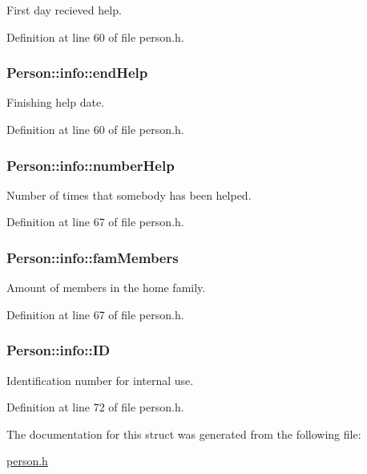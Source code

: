 First day recieved help. 



Definition at line 60 of file person.\+h.

\hypertarget{struct_person_1_1info_acc738154c5e01adc22c880fc49d6e09c}{
\subsubsection[{end\+Help}]{\setlength{\rightskip}{0pt plus 5cm}Person\+::info\+::end\+Help}}\label{struct_person_1_1info_acc738154c5e01adc22c880fc49d6e09c}


Finishing help date. 



Definition at line 60 of file person.\+h.

\hypertarget{struct_person_1_1info_a6fd0e334bf6cc9baf667ef94806ed993}{
\subsubsection[{number\+Help}]{\setlength{\rightskip}{0pt plus 5cm}Person\+::info\+::number\+Help}}\label{struct_person_1_1info_a6fd0e334bf6cc9baf667ef94806ed993}


Number of times that somebody has been helped. 



Definition at line 67 of file person.\+h.

\hypertarget{struct_person_1_1info_afc121f83e810c2c0318e115f4ba6d730}{
\subsubsection[{fam\+Members}]{\setlength{\rightskip}{0pt plus 5cm}Person\+::info\+::fam\+Members}}\label{struct_person_1_1info_afc121f83e810c2c0318e115f4ba6d730}


Amount of members in the home family. 



Definition at line 67 of file person.\+h.

\hypertarget{struct_person_1_1info_a535ca27747d371eb58005194190f6bd6}{
\subsubsection[{I\+D}]{\setlength{\rightskip}{0pt plus 5cm}Person\+::info\+::\+I\+D}}\label{struct_person_1_1info_a535ca27747d371eb58005194190f6bd6}


Identification number for internal use. 



Definition at line 72 of file person.\+h.



The documentation for this struct was generated from the following file\+:\begin{DoxyCompactItemize}
\item 
\hyperlink{person_8h}{person.\+h}\end{DoxyCompactItemize}
